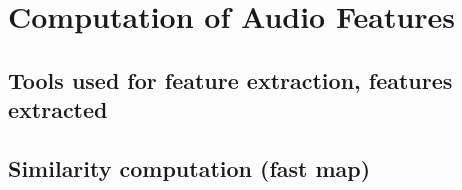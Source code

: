 \chapter{Computation of Audio Features} %

\label{Chapter5} %


\section{Tools used for feature extraction, features extracted}
\section{Similarity computation (fast map)}